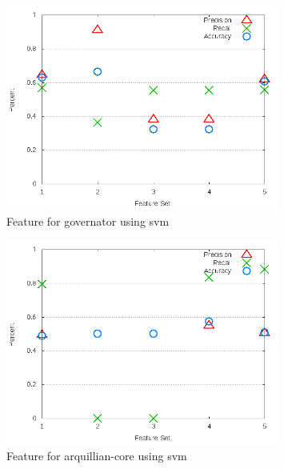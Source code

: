 \begin{figure}[!t]
\centering
\includegraphics[width=0.8\textwidth]{images/svm/test_3/governator_sample_range.png}
\caption{Feature for governator using \gls{svm}}
\label{fig:test_3_governator_svm}
\end{figure}

\begin{figure}[!t]
\centering
\includegraphics[width=0.8\textwidth]{images/svm/test_3/arquillian-core_sample_range.png}
\caption{Feature for arquillian-core using \gls{svm}}
\label{fig:test_3_arquillian-core_svm}
\end{figure}

